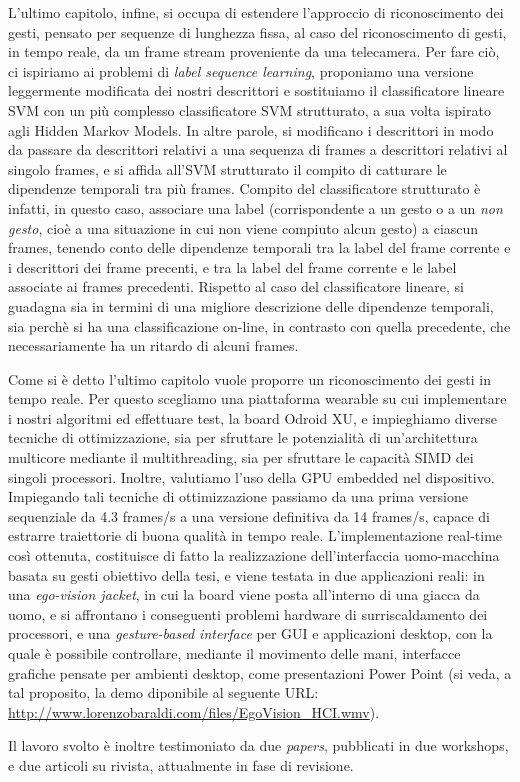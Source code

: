 \documentclass[11pt, oneside]{Thesis} %
\begin{document}
{L'ultimo capitolo, infine, si occupa di estendere l'approccio di riconoscimento dei gesti, pensato per sequenze di lunghezza fissa, al caso del riconoscimento di gesti, in tempo reale, da un frame stream proveniente da una telecamera. Per fare ciò, ci ispiriamo ai problemi di \textit{label sequence learning}, proponiamo una versione leggermente modificata dei nostri descrittori e sostituiamo il classificatore lineare SVM con un più complesso classificatore SVM strutturato, a sua volta ispirato agli Hidden Markov Models. In altre parole, si modificano i descrittori in modo da passare da descrittori relativi a una sequenza di frames a descrittori relativi al singolo frames, e si affida all'SVM strutturato il compito di catturare le dipendenze temporali tra più frames. Compito del classificatore strutturato è infatti, in questo caso, associare una label (corrispondente a un gesto o a un \textit{non gesto}, cioè a una situazione in cui non viene compiuto alcun gesto) a ciascun frames, tenendo conto delle dipendenze temporali tra la label del frame corrente e i descrittori dei frame precenti, e tra la label del frame corrente e le label associate ai frames precedenti. Rispetto al caso del classificatore lineare, si guadagna sia in termini di una migliore descrizione delle dipendenze temporali, sia perchè si ha una classificazione on-line, in contrasto con quella precedente, che necessariamente ha un ritardo di alcuni frames.

Come si è detto l'ultimo capitolo vuole proporre un riconoscimento dei gesti in tempo reale. Per questo scegliamo una piattaforma wearable su cui implementare i nostri algoritmi ed effettuare test, la board Odroid XU, e impieghiamo diverse tecniche di ottimizzazione, sia per sfruttare le potenzialità di un'architettura multicore mediante il multithreading, sia per sfruttare le capacità SIMD dei singoli processori. Inoltre, valutiamo l'uso della GPU embedded nel dispositivo. Impiegando tali tecniche di ottimizzazione passiamo da una prima versione sequenziale da 4.3 frames/s a una versione definitiva da 14 frames/s, capace di estrarre traiettorie di buona qualità in tempo reale.  L'implementazione real-time così ottenuta, costituisce di fatto la realizzazione dell'interfaccia uomo-macchina basata su gesti obiettivo della tesi, e viene testata in due applicazioni reali: in una \textit{ego-vision jacket}, in cui la board viene posta all'interno di una giacca da uomo, e si affrontano i conseguenti problemi hardware di surriscaldamento dei processori, e una \textit{gesture-based interface} per GUI e applicazioni desktop, con la quale è possibile controllare, mediante il movimento delle mani, interfacce grafiche pensate per ambienti desktop, come presentazioni Power Point (si veda, a tal proposito, la demo diponibile al seguente URL: \url{http://www.lorenzobaraldi.com/files/EgoVision_HCI.wmv}).

Il lavoro svolto è inoltre testimoniato da due \textit{papers}, pubblicati in due workshops, e due articoli su rivista, attualmente in fase di revisione.
}
%
\clearpage %
\end{document}

